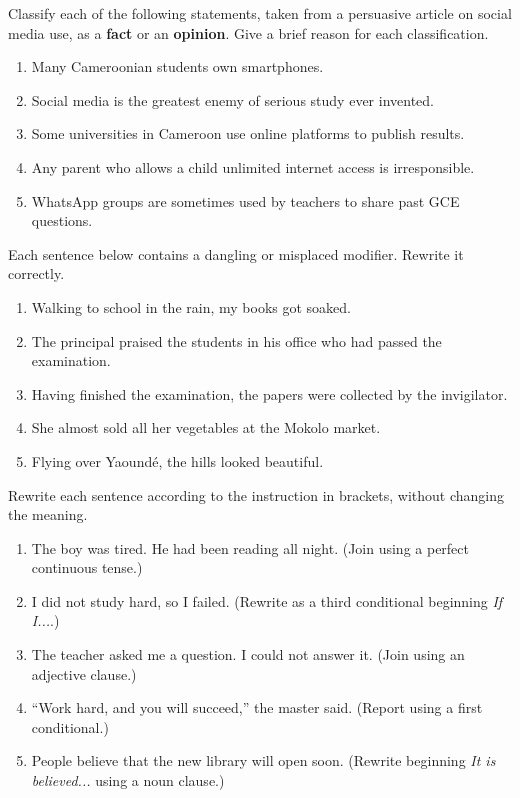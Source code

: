 \documentclass[11pt]{article}
\newcounter{popsec}
\newcounter{popsub}
\newcommand{\courssub}[1]{%
  \stepcounter{popsub}%
  \par\vspace{9pt}\noindent{\popxbold\fontsize{11.5}{13}\selectfont\color{popink}{\color{poporange}\thepopsec.\thepopsub}\hspace{6pt}#1}\par\nopagebreak\vspace{4pt}
}
\begin{document}
\courssub{I practise}

\begin{exercice}
Classify each of the following statements, taken from a persuasive article on social media use, as a \textbf{fact} or an \textbf{opinion}. Give a brief reason for each classification.
\begin{enumerate}
\item Many Cameroonian students own smartphones.
\item Social media is the greatest enemy of serious study ever invented.
\item Some universities in Cameroon use online platforms to publish results.
\item Any parent who allows a child unlimited internet access is irresponsible.
\item WhatsApp groups are sometimes used by teachers to share past GCE questions.
\end{enumerate}
\end{exercice}

\begin{exercice}
Each sentence below contains a dangling or misplaced modifier. Rewrite it correctly.
\begin{enumerate}
\item Walking to school in the rain, my books got soaked.
\item The principal praised the students in his office who had passed the examination.
\item Having finished the examination, the papers were collected by the invigilator.
\item She almost sold all her vegetables at the Mokolo market.
\item Flying over Yaoundé, the hills looked beautiful.
\end{enumerate}
\end{exercice}

\begin{exercice}
Rewrite each sentence according to the instruction in brackets, without changing the meaning.
\begin{enumerate}
\item The boy was tired. He had been reading all night. (Join using a perfect continuous tense.)
\item I did not study hard, so I failed. (Rewrite as a third conditional beginning \emph{If I...}.)
\item The teacher asked me a question. I could not answer it. (Join using an adjective clause.)
\item ``Work hard, and you will succeed,'' the master said. (Report using a first conditional.)
\item People believe that the new library will open soon. (Rewrite beginning \emph{It is believed...} using a noun clause.)
\end{enumerate}
\end{exercice}
\end{document}
